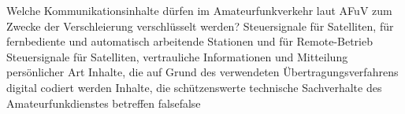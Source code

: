     {Welche Kommunikationsinhalte dürfen im Amateurfunkverkehr laut AFuV zum Zwecke der Verschleierung verschlüsselt werden?}
    {Steuersignale für Satelliten, für fernbediente und automatisch arbeitende Stationen und für Remote-Betrieb}
    {Steuersignale für Satelliten, vertrauliche Informationen und Mitteilung persönlicher Art}
    {Inhalte, die auf Grund des verwendeten Übertragungsverfahrens digital codiert werden}
    {Inhalte, die schützenswerte technische Sachverhalte des Amateurfunkdienstes betreffen}
    {false}{false}